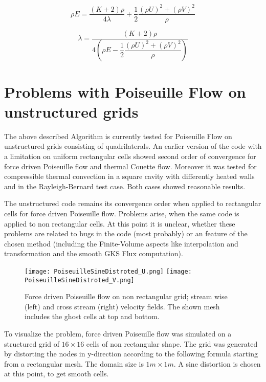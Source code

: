 \documentclass[
	pdftex,             %
	12pt,				%
	a4paper,		   	%
	english,				%
	oneside,			%
]{article}
\begin{document}
\begin{equation}
\rho E = \dfrac{(K+2)\rho}{4\lambda} + \dfrac{1}{2} \dfrac{(\rho U)^2 + (\rho V)^2}{\rho}
\end{equation}

\begin{equation}
\lambda =\frac{(K+2)\rho}
{4\left( \rho E - \dfrac{1}{2} \dfrac{(\rho U)^2 + (\rho V)^2}{\rho}  \right)}
\end{equation}

\clearpage
\section{Problems with Poiseuille Flow on unstructured grids}

The above described Algorithm is currently tested for Poiseuille Flow on unstructured grids consisting of quadrilaterals. An earlier version of the code with a limitation on uniform rectangular cells showed second order of convergence for force driven Poiseuille flow and thermal Couette flow. Moreover it was tested for compressible thermal convection in a square cavity with differently heated walls and in the Rayleigh-Bernard test case. Both cases showed reasonable results.

The unstructured code remains its convergence order when applied to rectangular cells for force driven Poiseuille flow. Problems arise, when the same code is applied to non rectangular cells. At this point it is unclear, whether these problems are related to bugs in the code (most probably) or an feature of the chosen method (including the Finite-Volume aspects like interpolation and transformation and the smooth GKS Flux computation).

\begin{figure}[h!]
\center
\texttt{[image: PoiseuilleSineDistroted\_U.png]}
\texttt{[image: PoiseuilleSineDistroted\_V.png]}
\caption{Force driven Poiseuille flow on non rectangular grid; stream wise (left) and cross stream (right) velocity fields. The shown mesh includes the ghost cells at top and bottom.}
\label{fig:Poseieuille16x16}
\end{figure}

To visualize the problem, force driven Poiseuille flow was simulated on a structured grid of $16 \times 16$ cells of non rectangular shape. The grid was generated by distorting the nodes in y-direction according to the following formula starting from a rectangular mesh. The domain size is $1m \times 1m$. A sine distortion is chosen at this point, to get smooth cells.
\end{document}
